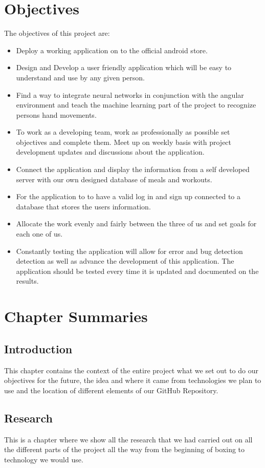 \documentclass[a4paper,12pt,twoside]{report}
\begin{document}
\section{Objectives}
The objectives of this project are:
\begin{itemize}

\item Deploy a working application on to the official android store.
\item Design and Develop a user friendly application which will be easy to understand and use by any given person.
\item Find a way to integrate neural networks in conjunction with the angular environment and teach the machine learning part of the project to recognize persons hand movements.
\item To work as a developing team, work as professionally as possible set objectives and complete them. Meet up on weekly basis with project development updates and discussions about the application. 
\item Connect the application and display the information from a self developed server with our own designed database of meals and workouts.
\item For the application to to have a valid log in and sign up connected to a database that stores the users information.
\item Allocate the work evenly and fairly between the three of us and set goals for each one of us.
\item Constantly testing the application will allow for error and bug detection detection as well as advance the development of this application. The application should be tested every time it is updated and documented on the results.  
\end{itemize}

\section{Chapter Summaries}
\subsection{Introduction}
This chapter contains the context of the entire project what we set out to do our objectives for the future, the idea and where it came from technologies we plan to use and the location of different elements of our GitHub Repository. 

\subsection{Research}
This is a chapter where we show all the research that we had carried out on all the different parts of the project all the way from the beginning of boxing to technology we would use.
\end{document}
